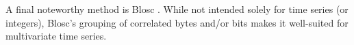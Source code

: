 A final noteworthy method is Blosc \cite{blosc}. While not intended solely for time series (or integers), Blosc's grouping of correlated bytes and/or bits \cite{bitshuf} makes it well-suited for multivariate time series.





